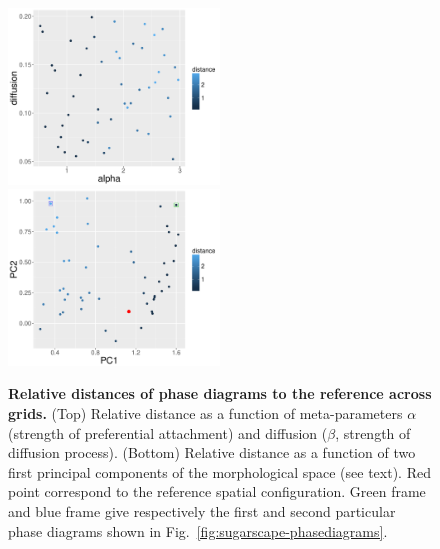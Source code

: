 \documentclass[Afour,sageh,times]{sagej}
\begin{document}

\begin{figure}
\centering
\includegraphics[width=0.5\textwidth]{figures/relativedistance_metaparams}\\
\includegraphics[width=0.5\textwidth]{figures/relativedistance_morphspace}
\caption{\textbf{Relative distances of phase diagrams to the reference across grids.} (Top) Relative distance as a function of meta-parameters $\alpha$ (strength of preferential attachment) and diffusion ($\beta$, strength of diffusion process). (Bottom) Relative distance as a function of two first principal components of the morphological space (see text). Red point correspond to the reference spatial configuration. Green frame and blue frame give respectively the first and second particular phase diagrams shown in Fig.~\ref{fig:sugarscape-phasediagrams}.}
\label{fig:sugarscape-distance}
\end{figure}



\end{document}
